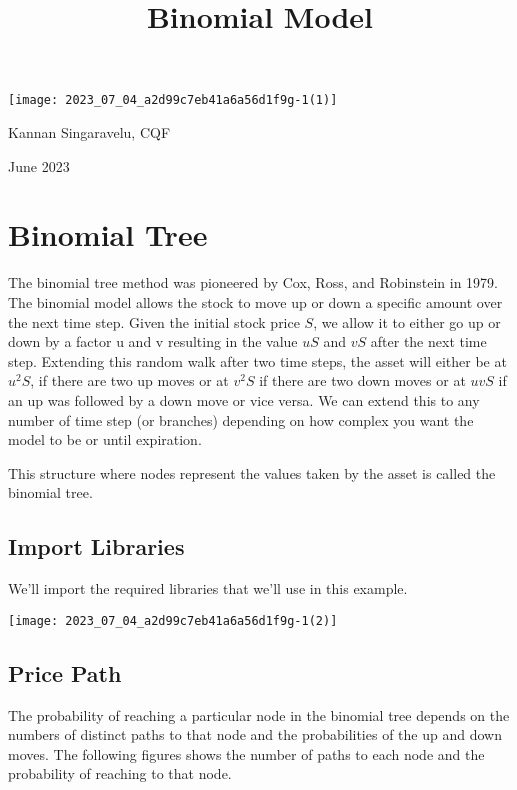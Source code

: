 \documentclass[10pt]{article}
\title{Binomial Model }
\author{}
\date{}
\begin{document}
\maketitle
\begin{center}
\texttt{[image: 2023\_07\_04\_a2d99c7eb41a6a56d1f9g-1(1)]}
\end{center}

Kannan Singaravelu, CQF

June 2023

\section*{Binomial Tree}
The binomial tree method was pioneered by Cox, Ross, and Robinstein in 1979. The binomial model allows the stock to move up or down a specific amount over the next time step. Given the initial stock price $S$, we allow it to either go up or down by a factor $\mathrm{u}$ and $\mathrm{v}$ resulting in the value $u S$ and $v S$ after the next time step. Extending this random walk after two time steps, the asset will either be at $u^{2} S$, if there are two up moves or at $v^{2} S$ if there are two down moves or at $u v S$ if an up was followed by a down move or vice versa. We can extend this to any number of time step (or branches) depending on how complex you want the model to be or until expiration.

This structure where nodes represent the values taken by the asset is called the binomial tree.

\subsection*{Import Libraries}
We'll import the required libraries that we'll use in this example.

\begin{center}
\texttt{[image: 2023\_07\_04\_a2d99c7eb41a6a56d1f9g-1(2)]}
\end{center}

\subsection*{Price Path}
The probability of reaching a particular node in the binomial tree depends on the numbers of distinct paths to that node and the probabilities of the up and down moves. The following figures shows the number of paths to each node and the probability of reaching to that node.
\end{document}
